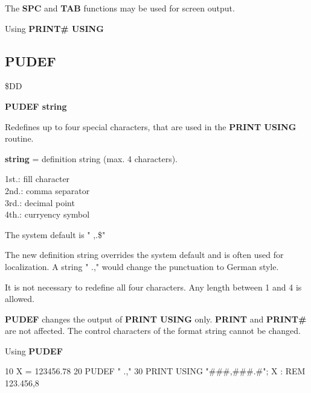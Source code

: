 \begin{description}[leftmargin=3cm,style=nextline]
\item [Remarks:] The {\bf SPC} and {\bf TAB} functions
                 may be used for screen output.

\item [Example:] Using {\bf PRINT\# USING}

\end{description}


\newpage
\subsection{PUDEF}
\begin{description}[leftmargin=3cm,style=nextline]
\item [Token:] \$DD
\item [Format:] {\bf PUDEF string}
\item [Usage:]  Redefines up to four special characters, that are
                used in the {\bf PRINT USING} routine.

                {\bf string} = definition string (max. 4 characters).

{\ttfamily
                1st.: fill character \\
                2nd.: comma separator \\
                3rd.: decimal point \\
                4th.: curryency symbol \\
}

                The system default is " ,.\$"

                The new definition string overrides the system
                default and is often used for localization.
                A string " .," would change the punctuation to
                German style.

                It is not necessary to redefine all four characters.
                Any length between 1 and 4 is allowed.

\item [Remarks:] {\bf PUDEF} changes the output of {\bf PRINT USING}
                 only. {\bf PRINT} and {\bf PRINT\#} are not affected.
                 The control characters of the format string
                 cannot be changed.

\item [Example:] Using {\bf PUDEF}

\begin{screenoutput}
 10 X = 123456.78
 20 PUDEF " .,"
 30 PRINT USING "###,###.#"; X : REM 123.456,8
\end{screenoutput}
\end{description}

